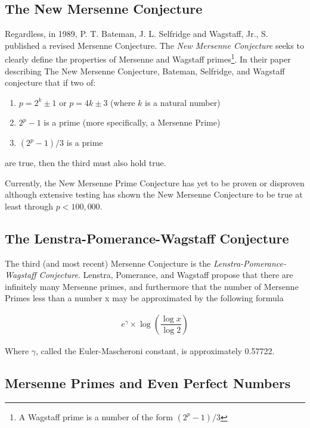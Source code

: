 \subsection{The New Mersenne Conjecture}

Regardless, in 1989, P. T. Bateman, J. L. Selfridge and Wagstaff, Jr., S. published a revised Mersenne Conjecture.
The \textit{New Mersenne Conjecture} seeks to clearly define the properties of Mersenne and Wagstaff primes\footnote{A Wagstaff prime is a number of the form $(2^p-1)/3$}.
In their paper describing The New Mersenne Conjecture, Bateman, Selfridge, and Wagstaff conjecture that if two of: 
\begin{enumerate}
\item $p = 2^k \pm 1$ or $p = 4k \pm 3$ (where $k$ is a natural number)
\item $2^p - 1$ is a prime (more specifically, a Mersenne Prime)
\item $(2^p - 1)/3$ is a prime
\end{enumerate}
are true, then the third must also hold true.

Currently, the New Mersenne Prime Conjecture has yet to be proven or disproven although extensive testing
has shown the New Mersenne Conjecture to be true at least through $p < 100,000$.

\subsection{The Lenstra-Pomerance-Wagstaff Conjecture}

The third (and most recent) Mersenne Conjecture is the \textit{Lenstra-Pomerance-Wagstaff Conjecture}. 
Lenstra, Pomerance, and Wagstaff propose that there are infinitely many Mersenne primes, and furthermore
that the number of Mersenne Primes less than a number x may be approximated by the following formula~\cite{utm.edu-heuristic}

\begin{align}
e^{\gamma} \times \log \left( \dfrac{\log{x}}{\log{2}} \right)
\end{align}

Where $\gamma$, called the Euler-Mascheroni constant, is approximately 0.57722.
\subsection{Mersenne Primes and Even Perfect Numbers}

